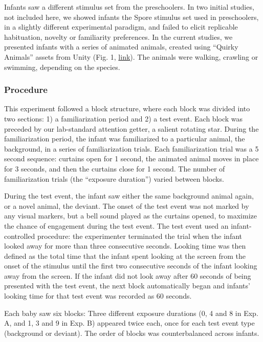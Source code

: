 \documentclass[10pt, letterpaper]{article}
\begin{document}
Infants saw a different stimulus set from the preschoolers. In two
initial studies, not included here, we showed infants the Spore stimulus
set used in preschoolers, in a slightly different experimental paradigm,
and failed to elicit replicable habituation, novelty or familiarity
preferences. In the current studies, we presented infants with a series
of animated animals, created using ``Quirky Animals'' assets from Unity
(Fig. 1, \href{https://tinyurl.com/469xxrn7}{link}). The animals were
walking, crawling or swimming, depending on the species.

\hypertarget{procedure-1}{%
\subsubsection{Procedure}\label{procedure-1}}

This experiment followed a block structure, where each block was divided
into two sections: 1) a familiarization period and 2) a test event. Each
block was preceded by our lab-standard attention getter, a salient
rotating star. During the familiarization period, the infant was
familiarized to a particular animal, the background, in a series of
familiarization trials. Each familiarization trial was a 5 second
sequence: curtains open for 1 second, the animated animal moves in place
for 3 seconds, and then the curtains close for 1 second. The number of
familiarization trials (the ``exposure duration'') varied between
blocks.

During the test event, the infant saw either the same background animal
again, or a novel animal, the deviant. The onset of the test event was
not marked by any visual markers, but a bell sound played as the
curtains opened, to maximize the chance of engagement during the test
event. The test event used an infant-controlled procedure: the
experimenter terminated the trial when the infant looked away for more
than three consecutive seconds. Looking time was then defined as the
total time that the infant spent looking at the screen from the onset of
the stimulus until the first two consecutive seconds of the infant
looking away from the screen. If the infant did not look away after 60
seconds of being presented with the test event, the next block
automatically began and infants' looking time for that test event was
recorded as 60 seconds.

Each baby saw six blocks: Three different exposure durations (0, 4 and 8
in Exp. A, and 1, 3 and 9 in Exp. B) appeared twice each, once for each
test event type (background or deviant). The order of blocks was
counterbalanced across infants.
\end{document}
